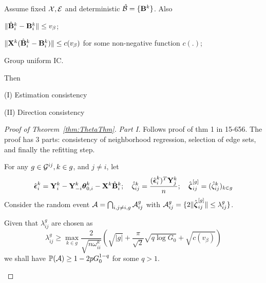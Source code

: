 \documentclass[fleqn,11pt]{article}
\numberwithin{equation}{section}
\begin{document}
\begin{Theorem}\label{thm:ThetaThm}
Assume fixed ${\cal{X}}, {\cal{E}}$ and deterministic $\hat {{\cal{B}}} = \{ {\mathbf{B}}^k \}$. Also

 $\| \hat {{\mathbf{B}}}_i^k - {\mathbf{B}}_i^k \| \leq v_\beta$;

 $\| {\mathbf{X}}^k (\hat {{\mathbf{B}}}_i^k - {\mathbf{B}}_i^k ) \| \leq c(v_\beta)$ for some non-negative function $c(.)$;

Group uniform IC.

Then

\noindent (I) Estimation consistency

\noindent (II) Direction consistency 
\end{Theorem}

\begin{proof}[Proof of Theorem~\ref{thm:ThetaThm}]


\textit{Part I.} Follows proof of thm 1 in 15-656. The proof has 3 parts: consistency of neighborhood regression, selection of edge sets, and finally the refitting step.

For any $g \in {\cal{G}}^{ij}, k \in g$, and $j \neq i$, let
%
$$
\hat {{\boldsymbol{\epsilon}}}_i^k = {\mathbf{Y}}_i^k - {\mathbf{Y}}_{-i}^k {\boldsymbol{\theta}}_{0,i}^k - {\mathbf{X}}^k \hat {{\mathbf{B}}}_i^k; \quad
\hat \zeta_{ij}^k = \frac{(\hat {{\boldsymbol{\epsilon}}}_i^k)^T {\mathbf{Y}}_j^k}{n}; \quad
\hat {{\boldsymbol{\zeta}}}_{ij}^{[g]} = (\hat \zeta_{ij}^k)_{k \in g}
$$
%
Consider the random event ${\cal{A}} = \bigcap_{i, j\neq i, g} {\cal{A}}_{ij}^g$ with ${\cal{A}}_{ij}^g = \{ 2 \| \hat {{\boldsymbol{\zeta}}}_{ij}^{[g]} \| \leq \lambda_{ij}^g \}$.

\begin{Proposition}\label{lemma:LemmaE2}
Given that $\lambda_{ij}^g$ are chosen as
%
$$
\lambda_{ij}^g \geq \max_{k \in g} \frac{2}{\sqrt{n \omega_{ii}^k}} \left( \sqrt{|g|} + \frac{\pi}{\sqrt 2} \sqrt {q \log G_0}  + \sqrt {c (v_\beta)} \right)
$$
%
we shall have $ {\mathbb{P}} ({\cal{A}}) \geq 1 - 2p G_0^{1-q} $ for some $q>1$.
\end{Proposition}


\end{proof}
\end{document}
